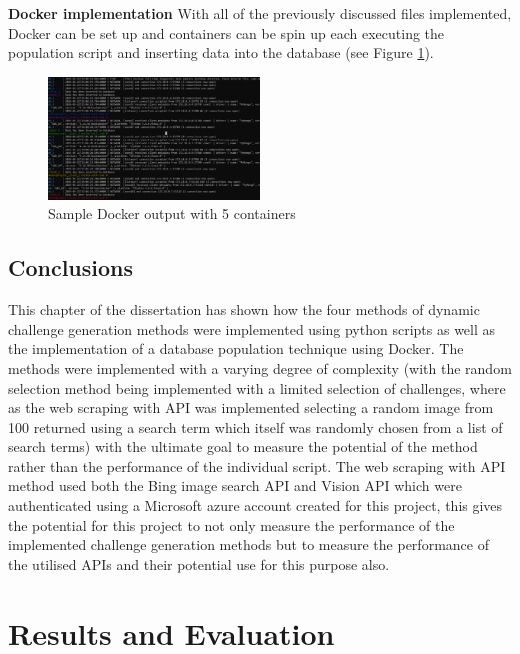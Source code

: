 \documentclass[12pt,a4paper]{article}
\begin{document}
\textbf{Docker implementation} 
With all of the previously discussed files implemented, Docker can be set up and containers can be spin up each executing the population script and inserting data into the database (see Figure \ref{Dockeroutput}).  

\begin{figure}[!ht]
    \centering
    \includegraphics[width=0.5\textwidth]{Figs/dockeroutput.PNG} 
    \caption{Sample Docker output with 5 containers} 
    \label{Dockeroutput}
\end{figure}

\subsection{Conclusions}
This chapter of the dissertation has shown how the four methods of dynamic challenge generation methods were implemented using python scripts as well as the implementation of a database population technique using Docker. The methods were implemented with a varying degree of complexity (with the random selection method being implemented with a limited selection of challenges, where as the web scraping with API was implemented selecting a random image from 100 returned using a search term which itself was randomly chosen from a list of search terms) with the ultimate goal to measure the potential of the method rather than the performance of the individual script. The web scraping with API method used both the Bing image search API and Vision API which were authenticated using a Microsoft azure account created for this project, this gives the potential for this project to not only measure the performance of the implemented challenge generation methods but to measure the performance of the utilised APIs and their potential use for this purpose also.

\newpage
\section{Results and Evaluation} 
\end{document}
